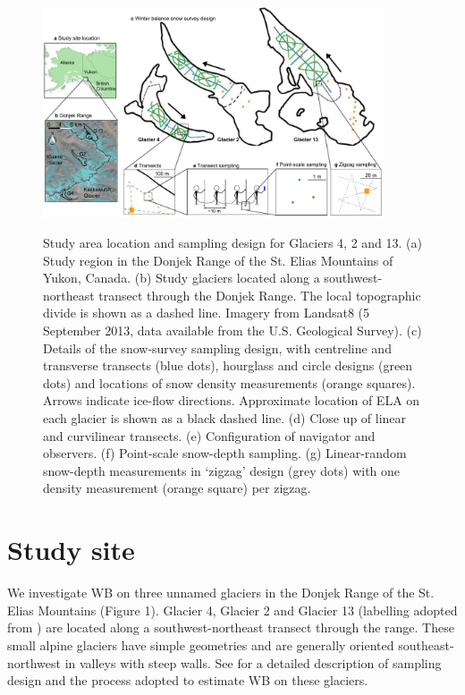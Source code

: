 \documentclass[twocolumn,letterpaper]{igs}
\begin{document}
\begin{figure}
	\centering
	\includegraphics[width =0.9\textwidth]{Sampling.pdf}\\
	\caption{Study area location and sampling design for Glaciers 4, 2 and 13. (a) Study region in the Donjek Range of the St. Elias Mountains of Yukon, Canada. (b) Study glaciers located along a southwest-northeast transect through the Donjek Range. The local topographic divide is shown as a dashed line. Imagery from Landsat8 (5 September 2013, data available from the U.S. Geological Survey). (c) Details of the snow-survey sampling design, with centreline and transverse transects (blue dots), hourglass and circle designs (green dots) and locations of snow density measurements (orange squares). Arrows indicate ice-flow directions. Approximate location of ELA on each glacier is shown as a black dashed line. (d) Close up of linear and curvilinear transects. (e) Configuration of navigator and observers. (f) Point-scale snow-depth sampling. (g) Linear-random snow-depth measurements in `zigzag' design (grey dots) with one density measurement (orange square) per zigzag.}
	\label{fig:Sampling}
\end{figure}

\section{Study site}

We investigate WB on three unnamed glaciers in the Donjek Range of the St. Elias Mountains (Figure 1). Glacier 4, Glacier 2 and Glacier 13 (labelling adopted from \cite{Crompton2016}) are located along a southwest-northeast transect through the range. These small alpine glaciers have simple geometries and are generally oriented southeast-northwest in valleys with steep walls. See \cite{Pulwicki2017} for a detailed description of sampling design and the process adopted to estimate WB on these glaciers. 
\end{document}

